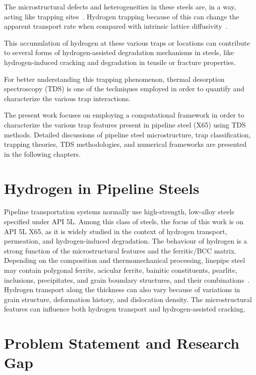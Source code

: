 \documentclass[a4paper,12pt,oneside]{report}
\begin{document}
The microstructural defects and heterogeneities in these steels are, in a way, acting like trapping sites~\cite{Darken1949,Oriani1970,Krom2000}. Hydrogen trapping because of this can change the apparent transport rate when compared with intrinsic lattice diffusivity~\cite{Fallahmohammadi2013,McNabb1963}.

This accumulation of hydrogen at these various traps or locations can contribute to several forms of hydrogen-assisted degradation mechanisms in steels, like hydrogen-induced cracking and degradation in tensile or fracture properties.

For better understanding this trapping phenomenon, thermal desorption spectroscopy (TDS) is one of the techniques employed in order to quantify and characterize the various trap interactions.

The present work focuses on employing a computational framework in order to characterize the various trap features present in pipeline steel (X65) using TDS methods. Detailed discussions of pipeline steel microstructure, trap classification, trapping theories, TDS methodologies, and numerical frameworks are presented in the following chapters.

\section{Hydrogen in Pipeline Steels}

Pipeline transportation systems normally use high-strength, low-alloy steels specified under API 5L. Among this class of steels, the focus of this work is on API 5L X65, as it is widely studied in the context of hydrogen transport, permeation, and hydrogen-induced degradation. The behaviour of hydrogen is a strong function of the microstructural features and the ferritic/BCC matrix. Depending on the composition and thermomechanical processing, linepipe steel may contain polygonal ferrite, acicular ferrite, bainitic constituents, pearlite, inclusions, precipitates, and grain boundary structures, and their combinations~\cite{Ohaeri2018,Jack2020,Koren2024b}. Hydrogen transport along the thickness can also vary because of variations in grain structure, deformation history, and dislocation density. The microstructural features can influence both hydrogen transport and hydrogen-assisted cracking.

\section{Problem Statement and Research Gap}
\end{document}

